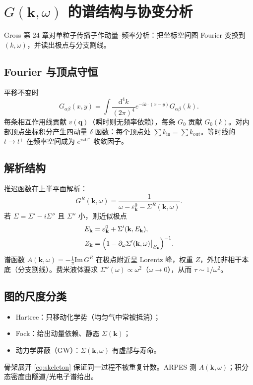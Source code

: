 \section{\texorpdfstring{$G(\mathbf{k},\omega)$}{G(k,omega)} 的谱结构与协变分析}

Gross 第 24 章对单粒子传播子作动量--频率分析：把坐标空间图 Fourier 变换到 $(k,\omega)$，并读出极点与分支割线。

\subsection{Fourier 与顶点守恒}

平移不变时
\begin{equation}
  G_{\alpha\beta}(x,y)
  =\int\frac{\mathrm{d}^4k}{(2\pi)^4}
  e^{-ik\cdot(x-y)}
  G_{\alpha\beta}(k).
\end{equation}
每条相互作用线贡献 $v(\mathbf{q})$（瞬时则无频率依赖），每条 $G_0$ 贡献 $G_0(k)$。对内部顶点坐标积分产生四动量 $\delta$ 函数：每个顶点处 $\sum k_{\mathrm{in}}=\sum k_{\mathrm{out}}$。等时线的 $t\to t^+$ 在频率空间成为 $e^{i\omega 0^+}$ 收敛因子。

\subsection{解析结构}

推迟函数在上半平面解析：
\begin{equation}
  G^R(\mathbf{k},\omega)
  =\frac{1}{\omega-\varepsilon_{\mathbf{k}}^0-\Sigma^R(\mathbf{k},\omega)}.
\end{equation}
若 $\Sigma=\Sigma'-i\Sigma''$ 且 $\Sigma''$ 小，则近似极点
\begin{equation}
\begin{aligned}
  E_{\mathbf{k}}
  &=\varepsilon_{\mathbf{k}}^0+\Sigma'(\mathbf{k},E_{\mathbf{k}}),\\
  Z_{\mathbf{k}}
  &=\Bigl(
  1-\partial_\omega\Sigma'(\mathbf{k},\omega)\big|_{E_{\mathbf{k}}}
  \Bigr)^{-1}.
\end{aligned}
\end{equation}
谱函数 $A(\mathbf{k},\omega)=-\frac{1}{\pi}\mathrm{Im}\,G^R$ 在极点附近呈 Lorentz 峰，权重 $Z$，外加非相干本底（分支割线）。费米液体要求 $\Sigma''(\omega)\propto\omega^2$（$\omega\to0$），从而 $\tau\sim1/\omega^2$。

\subsection{图的尺度分类}

\begin{itemize}
  \item Hartree：只移动化学势（均匀气中常被抵消）；
  \item Fock：给出动量依赖、静态 $\Sigma(\mathbf{k})$；
  \item 动力学屏蔽（GW）：$\Sigma(\mathbf{k},\omega)$ 有虚部与寿命。
\end{itemize}
骨架展开 \eqref{eq:skeleton} 保证同一过程不被重复计数。ARPES 测 $A(\mathbf{k},\omega)$；积分态密度由隧道/光电子谱给出。
